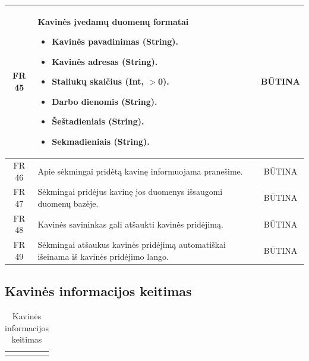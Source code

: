 \documentclass{VUMIFPSkursinis}
\begin{document}
{{{{{\begin{center}
\begin{table}[H]
\begin{tabular}{|p{2cm}|p{}|p{}|}
	\hline
		\multicolumn{1}{|c|}{FR 45}&
		{Kavinės įvedamų duomenų formatai
			\begin{itemize}
				\item Kavinės pavadinimas (String).
				\item Kavinės adresas (String).
				\item Staliukų skaičius (Int, $>$0).
				\item Darbo dienomis (String).
				\item Šeštadieniais (String).
				\item Sekmadieniais (String).
			\end{itemize}}&
		\multicolumn{1}{|c|}{BŪTINA}\\	

	\hline
		\multicolumn{1}{|c|}{FR 46}&
		{Apie sėkmingai pridėtą kavinę informuojama pranešime.}&
		\multicolumn{1}{|c|}{BŪTINA}\\	

	\hline
		\multicolumn{1}{|c|}{FR 47}&
		{Sėkmingai pridėjus kavinę jos duomenys išsaugomi duomenų bazėje.}&
		\multicolumn{1}{|c|}{BŪTINA}\\	

	\hline
		\multicolumn{1}{|c|}{FR 48}&
		{Kavinės savininkas gali atšaukti kavinės pridėjimą.}&
		\multicolumn{1}{|c|}{BŪTINA}\\	

	\hline
		\multicolumn{1}{|c|}{FR 49}&
		{Sėkmingai atšaukus kavinės pridėjimą automatiškai išeinama iš kavinės pridėjimo lango.}&
		\multicolumn{1}{|c|}{BŪTINA}\\	

	\hline
	
	
	
	\end{tabular}
	
	\label{table:KavinėsPridėjimas}		
	\end{table}

\end{center}


\subsection{Kavinės informacijos keitimas}
\begin{center}
	\begin{table}[H]
	\caption{Kavinės informacijos keitimas}
	\begin{tabular}{|p{2cm}|p{}|p{}|}
	\hline
	    \rowcolor{lightgray}
		\multicolumn{3}{|c|}{Kavinės informacijos keitimas}\\
		

\end{tabular}
\end{table}
\end{center}}}}}}
\end{document}
